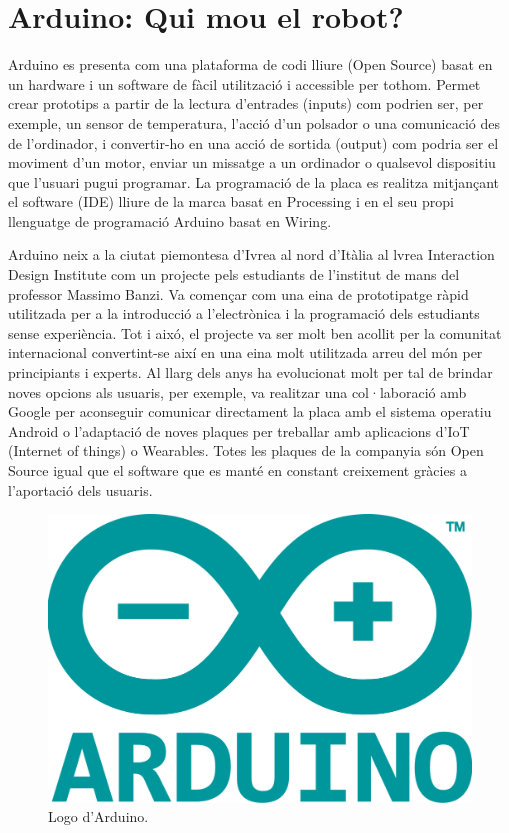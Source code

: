 \section{Arduino: Qui mou el robot?}

Arduino es presenta com una plataforma de codi lliure (Open Source) basat en un hardware i un software de fàcil utilització i accessible per tothom.  Permet crear prototips a partir de la lectura d’entrades (inputs) com podrien ser, per exemple, un sensor de temperatura, l’acció d’un polsador o una comunicació des de l’ordinador, i convertir-ho en una acció de sortida (output) com podria ser el moviment d’un motor, enviar un missatge a un ordinador o qualsevol dispositiu que l’usuari pugui programar. La programació de la placa es realitza mitjançant el software (IDE) lliure de la marca basat en Processing i en el seu propi llenguatge de programació Arduino basat en Wiring. 

Arduino neix a la ciutat piemontesa d’Ivrea al nord d’Itàlia al lvrea Interaction Design Institute com un projecte pels estudiants de l’institut de mans del professor Massimo Banzi. Va començar com una eina de prototipatge ràpid utilitzada per a la introducció a l’electrònica i la programació dels estudiants sense experiència. Tot i aixó, el projecte va ser molt ben acollit per la comunitat internacional convertint-se així en una eina molt utilitzada arreu del món per principiants i experts. Al llarg dels anys ha evolucionat molt per tal de brindar noves opcions als usuaris, per exemple, va realitzar una col·laboració amb Google per aconseguir comunicar directament la placa amb el sistema operatiu Android o l’adaptació de noves plaques per treballar amb aplicacions d’IoT (Internet of things) o Wearables. Totes les plaques de la companyia són Open Source igual que el software que es manté en constant creixement gràcies a l’aportació dels usuaris. 

\begin{figure}[H]
	\centering
	\includegraphics[scale=0.1]{arduino-logo.png}
	\caption{Logo d'Arduino.}
	\label{fig:arduinologo}
\end{figure}

